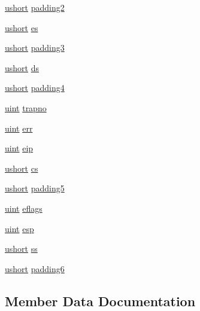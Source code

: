 \begin{DoxyCompactItemize}
\hyperlink{types_8h_ab95f123a6c9bcfee6a343170ef8c5f69}{ushort} \hyperlink{structtrapframe_a63737765c58491a8604ef180a3864ad0}{padding2}
\item 
\hyperlink{types_8h_ab95f123a6c9bcfee6a343170ef8c5f69}{ushort} \hyperlink{structtrapframe_ab974b358098da0aaa5897c32827a038d}{es}
\item 
\hyperlink{types_8h_ab95f123a6c9bcfee6a343170ef8c5f69}{ushort} \hyperlink{structtrapframe_acd8a8fee013b35212fab787b645f8dd9}{padding3}
\item 
\hyperlink{types_8h_ab95f123a6c9bcfee6a343170ef8c5f69}{ushort} \hyperlink{structtrapframe_a421be1ec9ad2a55f1d1adeac9b0b89c3}{ds}
\item 
\hyperlink{types_8h_ab95f123a6c9bcfee6a343170ef8c5f69}{ushort} \hyperlink{structtrapframe_aef4bc72b31fb4a0cf6b32782b40a7e2f}{padding4}
\item 
\hyperlink{types_8h_a91ad9478d81a7aaf2593e8d9c3d06a14}{uint} \hyperlink{structtrapframe_abc7f81b0a6a91d13e9fefe171b0a7d12}{trapno}
\item 
\hyperlink{types_8h_a91ad9478d81a7aaf2593e8d9c3d06a14}{uint} \hyperlink{structtrapframe_acfb2346e6184b0d2438960b4f2a67e4f}{err}
\item 
\hyperlink{types_8h_a91ad9478d81a7aaf2593e8d9c3d06a14}{uint} \hyperlink{structtrapframe_a886a5973a537894e3a95435f38767d5c}{eip}
\item 
\hyperlink{types_8h_ab95f123a6c9bcfee6a343170ef8c5f69}{ushort} \hyperlink{structtrapframe_a61261f63223a73e25be79fcc8c625265}{cs}
\item 
\hyperlink{types_8h_ab95f123a6c9bcfee6a343170ef8c5f69}{ushort} \hyperlink{structtrapframe_a5715f786df145b0bf6faf3aa3304f05f}{padding5}
\item 
\hyperlink{types_8h_a91ad9478d81a7aaf2593e8d9c3d06a14}{uint} \hyperlink{structtrapframe_ae6b3005ad34416546603ab18dbb4a644}{eflags}
\item 
\hyperlink{types_8h_a91ad9478d81a7aaf2593e8d9c3d06a14}{uint} \hyperlink{structtrapframe_acd319e2dbd720d217c10f8fb620d73e2}{esp}
\item 
\hyperlink{types_8h_ab95f123a6c9bcfee6a343170ef8c5f69}{ushort} \hyperlink{structtrapframe_aa9c9b52b242d4f42fe4252e26b655bf6}{ss}
\item 
\hyperlink{types_8h_ab95f123a6c9bcfee6a343170ef8c5f69}{ushort} \hyperlink{structtrapframe_a1c079b271df9fdd3502bfe9e00888dfa}{padding6}
\end{DoxyCompactItemize}


\subsection{Member Data Documentation}
